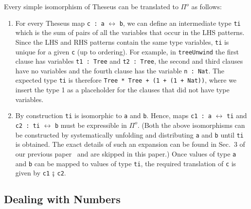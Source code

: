 \documentclass{article}
\newcommand{\ctr}[1]{{\scriptsize{\texttt{#1}}}}
\begin{document}
\label{translation}
\noindent
Every simple isomorphism of Theseus can be translated to \ensuremath{\Pi^{o}} as follows:
\begin{enumerate}
\item For every Theseus map \ctr{c : a} $\leftrightarrow$ \ctr{b}, we can
  define an intermediate type \ctr{ti} which is the sum of pairs of all the
  variables that occur in the LHS patterns. Since the LHS and RHS patterns
  contain the same type variables, \ctr{ti} is unique for a given \ctr{c} (up
  to ordering). For example, in \ctr{treeUnwind} the first clause has
  variables \lstinline{t1 : Tree} and \lstinline{t2 : Tree}, the second and
  third clauses have no variables and the fourth clause has the variable
  \lstinline{n : Nat}. The expected type \ctr{ti} is therefore
  \lstinline{Tree * Tree + (1 + (1 + Nat))}, where we insert the type
  {\scriptsize{1}} as a placeholder for the clauses that did not have type
  variables.
\item By construction \ctr{ti} is isomorphic to \ctr{a} and \ctr{b}. Hence,
  maps \ctr{c1 : a} $\leftrightarrow$ \ctr{ti} and \ctr{c2 : ti}
  $\leftrightarrow$ \ctr{b} must be expressible in \ensuremath{\Pi^{o}}. (Both the above
  isomorphisms can be constructed by systematically unfolding and
  distributing \ctr{a} and \ctr{b} until \ctr{ti} is obtained.  The exact
  details of such an expansion can be found in Sec.~3 of our previous
  paper~\cite{rc2012} and are skipped in this paper.) Once values of type
  \ctr{a} and \ctr{b} can be mapped to values of type \ctr{ti}, the required
  translation of \ctr{c} is given by \ctr{c1} $\fatsemi$ \ctr{c2}.
\end{enumerate}

\subsection{Dealing with Numbers}
\end{document}
